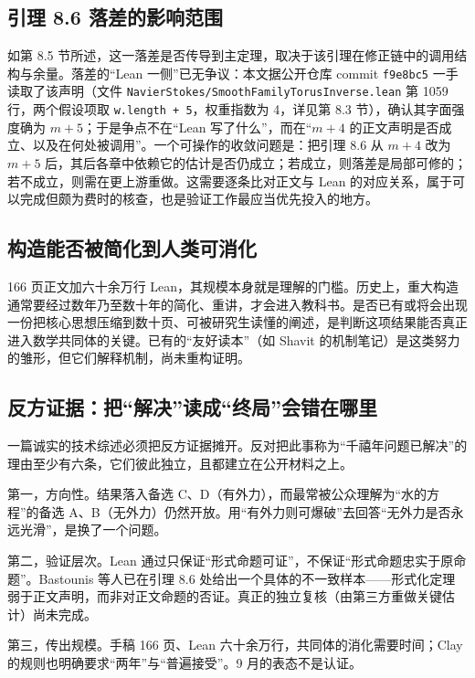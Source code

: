 \subsection{引理 8.6 落差的影响范围}

如第 8.5 节所述，这一落差是否传导到主定理，取决于该引理在修正链中的调用结构与余量。落差的“Lean 一侧”已无争议：本文据公开仓库 commit \texttt{f9e8bc5} 一手读取了该声明（文件 \texttt{NavierStokes/SmoothFamilyTorusInverse.lean} 第 1059 行，两个假设项取 \texttt{w.length + 5}，权重指数为 4，详见第 8.3 节），确认其字面强度确为 $m+5$；于是争点不在“Lean 写了什么”，而在“$m+4$ 的正文声明是否成立、以及在何处被调用”。一个可操作的收敛问题是：把引理 8.6 从 $m+4$ 改为 $m+5$ 后，其后各章中依赖它的估计是否仍成立；若成立，则落差是局部可修的；若不成立，则需在更上游重做。这需要逐条比对正文与 Lean 的对应关系，属于可以完成但颇为费时的核查，也是验证工作最应当优先投入的地方。

\subsection{构造能否被简化到人类可消化}

166 页正文加六十余万行 Lean，其规模本身就是理解的门槛。历史上，重大构造通常要经过数年乃至数十年的简化、重讲，才会进入教科书。是否已有或将会出现一份把核心思想压缩到数十页、可被研究生读懂的阐述，是判断这项结果能否真正进入数学共同体的关键。已有的“友好读本”（如 Shavit 的机制笔记\cite{shavit}）是这类努力的雏形，但它们解释机制，尚未重构证明。

\subsection{反方证据：把“解决”读成“终局”会错在哪里}

一篇诚实的技术综述必须把反方证据摊开。反对把此事称为“千禧年问题已解决”的理由至少有六条，它们彼此独立，且都建立在公开材料之上。

第一，方向性。结果落入备选 C、D（有外力），而最常被公众理解为“水的方程”的备选 A、B（无外力）仍然开放。用“有外力则可爆破”去回答“无外力是否永远光滑”，是换了一个问题。

第二，验证层次。Lean 通过只保证“形式命题可证”，不保证“形式命题忠实于原命题”。Bastounis 等人已在引理 8.6 处给出一个具体的不一致样本——形式化定理弱于正文声明，而非对正文命题的否证。真正的独立复核（由第三方重做关键估计）尚未完成。

第三，传出规模。手稿 166 页、Lean 六十余万行，共同体的消化需要时间；Clay 的规则也明确要求“两年”与“普遍接受”。9 月的表态不是认证。

